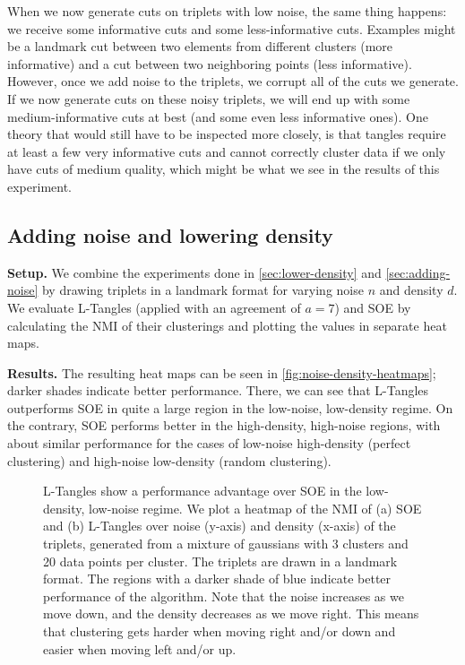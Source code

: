 When we now generate cuts on triplets with low noise, the same thing happens: we receive some informative cuts 
and some less-informative cuts. Examples might be a landmark cut between two elements from different clusters (more informative) and
a cut between two neighboring points (less informative). However, once we add noise to the triplets, we corrupt all of the cuts we generate. If we now generate cuts on these noisy triplets, we will 
end up with some medium-informative cuts at best (and some even less informative ones). 
One theory that would still have to be inspected more closely, is that tangles require at least a few very informative cuts and
cannot correctly cluster data if we only have cuts of medium quality, which might be what we see in the results of this experiment.

\subsection{Adding noise and lowering density}
\textbf{Setup.}
We combine the experiments done in \autoref{sec:lower-density} and \autoref{sec:adding-noise} by drawing triplets in a landmark format for varying 
noise $n$ and density $d$. We evaluate L-Tangles (applied with an agreement of $a=7$) and SOE by calculating the NMI of their clusterings and plotting the values in separate heat maps. 

\noindent
\textbf{Results.}
The resulting heat maps can be seen in \autoref{fig:noise-density-heatmaps}; darker shades indicate better performance.
There, we can see that L-Tangles outperforms SOE in quite a large region in the low-noise, low-density regime. 
On the contrary, SOE performs better in the high-density, high-noise regions, with about similar performance
for the cases of low-noise high-density (perfect clustering) and high-noise low-density (random clustering).

\begin{figure}[ht]
    \centering
    \caption{
        L-Tangles show a performance advantage over SOE in the low-density, low-noise regime. 
        We plot a heatmap of the NMI of (a) SOE and (b) L-Tangles over noise (y-axis) and density (x-axis) of the triplets, 
        generated from a mixture of gaussians with 3 clusters and 20 data points per cluster. The triplets are drawn in a landmark format. 
        The regions with a darker shade of blue indicate better performance of the algorithm. 
        Note that the noise increases as we move down, and the
        density decreases as we move right. This means that clustering gets harder when moving right and/or down and easier when moving left and/or up.
    }
    \label{fig:noise-density-heatmaps}
\end{figure}

